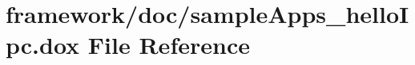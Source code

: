 \hypertarget{sample_apps__hello_ipc_8dox}{}\section{framework/doc/sample\+Apps\+\_\+hello\+Ipc.dox File Reference}
\label{sample_apps__hello_ipc_8dox}
